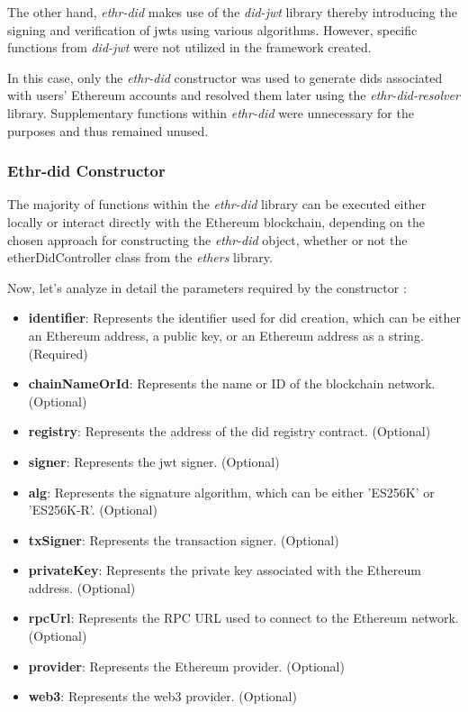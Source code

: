The other hand, \textit{ethr-did} makes use of the \textit{did-jwt} library thereby introducing the signing and verification of \gls{jwt}s using various algorithms. However, specific 
functions from \textit{did-jwt} were not utilized in the framework created. 

In this case, only the \textit{ethr-did} constructor was used to generate \gls{did}s associated with users' Ethereum accounts and resolved them later using the \textit{ethr-did-resolver} library. 
Supplementary functions within \textit{ethr-did} were unnecessary for the purposes and thus remained unused.

\subsubsection{Ethr-did Constructor}

The majority of functions within the \textit{ethr-did} library can be executed either locally or interact directly with the Ethereum blockchain, depending on the chosen approach for 
constructing the \textit{ethr-did} object, whether or not the etherDidController class from the \textit{ethers} library. 

Now, let's analyze in detail the parameters required by the constructor \cite{ethr-did}: 

\begin{itemize}
  \item \textbf{identifier}: Represents the identifier used for \gls{did} creation, which can be either an Ethereum address, a public key, or an Ethereum address as a string. (Required)
  \item \textbf{chainNameOrId}: Represents the name or ID of the blockchain network. (Optional)
  \item \textbf{registry}: Represents the address of the \gls{did} registry contract. (Optional)
  \item \textbf{signer}: Represents the \gls{jwt} signer. (Optional)
  \item \textbf{alg}: Represents the signature algorithm, which can be either 'ES256K' or 'ES256K-R'. (Optional)
  \item \textbf{txSigner}: Represents the transaction signer. (Optional)
  \item \textbf{privateKey}: Represents the private key associated with the Ethereum address. (Optional)
  \item \textbf{rpcUrl}: Represents the RPC URL used to connect to the Ethereum network. (Optional)
  \item \textbf{provider}: Represents the Ethereum provider. (Optional)
  \item \textbf{web3}: Represents the web3 provider. (Optional)
\end{itemize}

